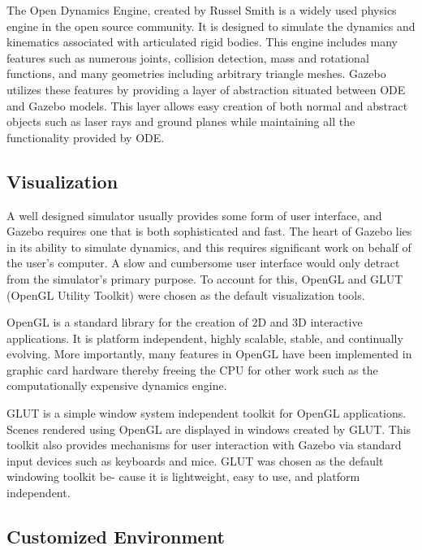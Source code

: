 The Open Dynamics Engine, created by Russel Smith is a widely used physics engine in the open source community. It is designed to simulate the dynamics and kinematics associated with articulated rigid bodies. This engine includes many features such as numerous joints, collision detection, mass and rotational functions, and many geometries including arbitrary triangle meshes. Gazebo utilizes these features by providing a layer of abstraction situated between ODE and Gazebo models. This layer allows easy creation of both normal and abstract objects such as laser rays and ground planes while maintaining all the functionality provided by ODE. %

\subsection{Visualization}

A well designed simulator usually provides some form of user interface, and Gazebo requires one that is both sophisticated and fast. The heart of Gazebo lies in its ability to simulate dynamics, and this requires significant work on behalf of the user's computer. A slow and cumbersome user interface would only detract from the simulator's primary purpose. To account for this, OpenGL and GLUT (OpenGL Utility Toolkit) were chosen as the default visualization tools.

OpenGL is a standard library for the creation of 2D and 3D interactive applications. It is platform independent, highly scalable, stable, and continually evolving. More importantly, many features in OpenGL have been implemented in graphic card hardware thereby freeing the CPU for other work such as the computationally expensive dynamics engine.

GLUT is a simple window system independent toolkit for OpenGL applications. Scenes rendered using OpenGL are displayed in windows created by GLUT. This toolkit also provides mechanisms for user interaction with Gazebo via standard input devices such as keyboards and mice. GLUT was chosen as the default windowing toolkit be- cause it is lightweight, easy to use, and platform independent.

\subsection{Customized Environment}

